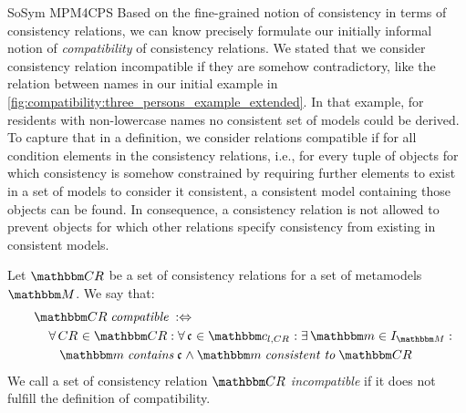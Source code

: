 \begin{copiedFrom}{SoSym MPM4CPS}
Based on the fine-grained notion of consistency in terms of consistency relations, we can know precisely formulate our initially informal notion of \emph{compatibility} of consistency relations.
We stated that we consider consistency relation incompatible if they are somehow contradictory, like the relation between names in our initial example in \autoref{fig:compatibility:three_persons_example_extended}.
In that example, for residents with non-lowercase names no consistent set of models could be derived.
To capture that in a definition, we consider relations compatible if for all condition elements in the consistency relations, i.e., for every tuple of objects for which consistency is somehow constrained by requiring further elements to exist in a set of models to consider it consistent, a consistent model containing those objects can be found. In consequence, a consistency relation is not allowed to prevent objects for which other relations specify consistency from existing in consistent models.

\begin{definition}[Compatibility] \label{def:compatibility}
    Let $\consistencyrelationset{CR}$ be a set of consistency relations for a set of metamodels $\metamodelset{M}$. %
    We say that:
    \begin{align*}
        \formulaskip &
        \consistencyrelationset{CR} \mathtext{compatible} \equivalentperdefinition \\
        & \formulaskip
        \forall \consistencyrelation{CR}{} \in \consistencyrelationset{CR} : \forall \conditionelement{c}{} \in \condition{c}{l, \consistencyrelation{CR}{}} %
        : \exists \modelset{m} \in \metamodelinstances{\metamodelset{M}} : \\
        & \formulaskip \formulaskip
        \modelset{m} \mathtext{contains} \conditionelement{c}{} \land \modelset{m} \mathtext{consistent to} \consistencyrelationset{CR}
    \end{align*}
    We call a set of consistency relation $\consistencyrelationset{CR}$ \emph{incompatible} if it does not fulfill the definition of compatibility.
\end{definition}


\end{copiedFrom}
